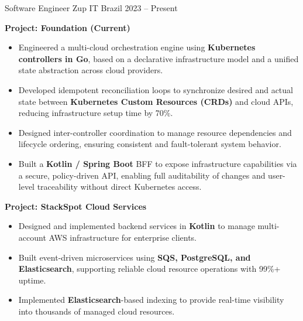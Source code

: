 
\begin{cventries}


	\cventry
	{Software Engineer}
	{Zup IT}
	{Brazil}
	{2023 -- Present}
	{
		\begin{cvitems}
			\item \textbf{Project: Foundation (Current)}
			\begin{itemize}
				\item Engineered a multi-cloud orchestration engine using \textbf{Kubernetes controllers in Go}, based on a declarative infrastructure model and a unified state abstraction across cloud providers.
				\item Developed idempotent reconciliation loops to synchronize desired and actual state between \textbf{Kubernetes Custom Resources (CRDs)} and cloud APIs, reducing infrastructure setup time by 70\%.
				\item Designed inter-controller coordination to manage resource dependencies and lifecycle ordering, ensuring consistent and fault-tolerant system behavior.
				\item Built a \textbf{Kotlin / Spring Boot} BFF to expose infrastructure capabilities via a secure, policy-driven API, enabling full auditability of changes and user-level traceability without direct Kubernetes access.
			\end{itemize}
			\item \textbf{Project: StackSpot Cloud Services}
			\begin{itemize}
				\item Designed and implemented backend services in \textbf{Kotlin} to manage multi-account AWS infrastructure for enterprise clients.
				\item Built event-driven microservices using \textbf{SQS, PostgreSQL, and Elasticsearch}, supporting reliable cloud resource operations with 99\%+ uptime.
				\item Implemented \textbf{Elasticsearch}-based indexing to provide real-time visibility into thousands of managed cloud resources.
			\end{itemize}
		\end{cvitems}
	}
	

\end{cventries}
